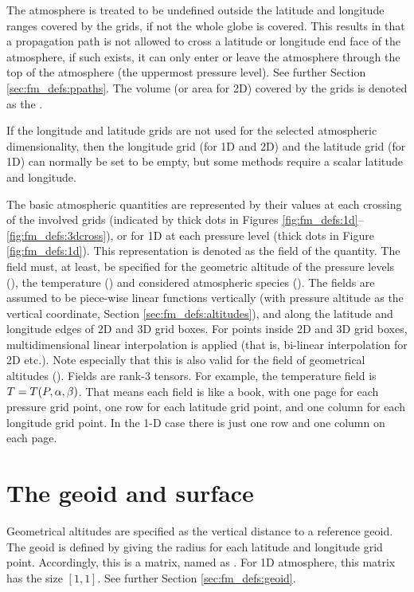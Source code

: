 The atmosphere is treated to be undefined outside the latitude and
longitude ranges covered by the grids, if not the whole globe is
covered. This results in that a propagation path is not allowed to
cross a latitude or longitude end face of the atmosphere, if such
exists, it can only enter or leave the atmosphere through the top of
the atmosphere (the uppermost pressure level). See further
Section \ref{sec:fm_defs:ppaths}. The volume (or area for 2D) covered
by the grids is denoted as the .

If the longitude and latitude grids are not used for the selected atmospheric
dimensionality, then the longitude grid (for 1D and 2D) and the latitude grid
(for 1D) can normally be set to be empty, but some methods require a scalar
latitude and longitude. 

The basic atmospheric quantities are represented by their values at
each crossing of the involved grids (indicated by thick dots in
Figures \ref{fig:fm_defs:1d}--\ref{fig:fm_defs:3dcross}), or for 1D
at each pressure level (thick dots in Figure \ref{fig:fm_defs:1d}).
This representation is denoted as the field
of the quantity. The field must, at least, be specified for the
geometric altitude of the pressure levels (), the
temperature () and considered atmospheric species
().  The fields are assumed to be piece-wise
linear functions vertically (with pressure altitude as the vertical
coordinate, Section \ref{sec:fm_defs:altitudes}), and along the
latitude and longitude edges of 2D and 3D grid boxes. For points
inside 2D and 3D grid boxes, multidimensional linear interpolation is
applied (that is, bi-linear interpolation for 2D etc.). Note especially
that this is also valid for the field of geometrical altitudes
(). Fields are rank-3 tensors. For example, the
temperature field is $T=T(P,\alpha,\beta)$. That means each field is
like a book, with one page for each pressure grid point, one row for
each latitude grid point, and one column for each longitude grid
point. In the 1-D case there is just one row and one column on each
page.



\section{The geoid and surface}
\label{sec:fm_defs:surf}

Geometrical altitudes are specified as the vertical distance to a reference
geoid. The geoid is defined by giving the radius for each latitude and
longitude grid point. Accordingly, this is a matrix, named as
. For 1D atmosphere, this matrix has the size $[1,1]$.
See further Section \ref{sec:fm_defs:geoid}.

